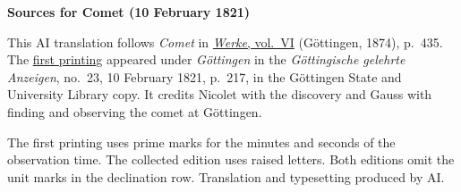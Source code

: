 \clearpage\thispagestyle{empty}
\begin{center}\textbf{Sources for Comet (10 February 1821)}\end{center}
\noindent This AI translation follows \textit{Comet} in \href{https://gdz.sub.uni-goettingen.de/id/PPN236007467}{\textit{Werke}, vol.~VI} (Göttingen, 1874), p.~435. The \href{https://images.p.sub.uni-goettingen.de/iiif/image/gdz:PPN319721507_1821:00000217/full/1600,/0/default.jpg}{first printing} appeared under \textit{Göttingen} in the \textit{Göttingische gelehrte Anzeigen}, no.~23, 10 February 1821, p.~217, in the Göttingen State and University Library copy. It credits Nicolet with the discovery and Gauss with finding and observing the comet at Göttingen.
\par\smallskip\noindent The first printing uses prime marks for the minutes and seconds of the observation time. The collected edition uses raised letters. Both editions omit the unit marks in the declination row. Translation and typesetting produced by AI.
\clearpage
